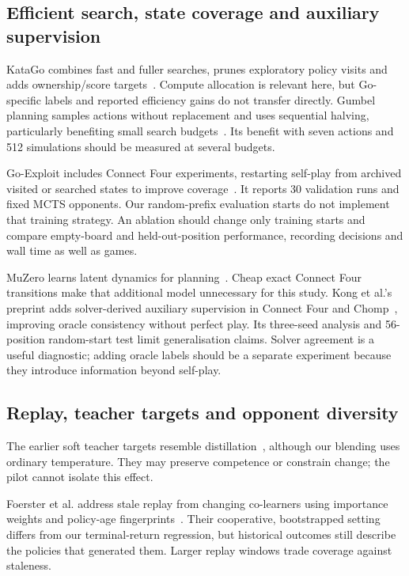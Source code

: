 \documentclass[letterpaper]{article}
\begin{document}
\subsection{Efficient search, state coverage and auxiliary supervision}
KataGo combines fast and fuller searches, prunes exploratory policy visits and
adds ownership/score targets~\cite{wu2019}. Compute allocation is relevant here,
but Go-specific labels and reported efficiency gains do not transfer directly.
Gumbel planning samples actions without replacement and uses sequential halving,
particularly benefiting small search budgets~\cite{danihelka2022}. Its benefit
with seven actions and 512 simulations should be measured at several budgets.

Go-Exploit includes Connect Four experiments, restarting self-play from archived
visited or searched states to improve coverage~\cite{trudeau2023}. It reports
30 validation runs and fixed MCTS opponents. Our random-prefix evaluation starts
do not implement that training strategy. An ablation should change only training
starts and compare empty-board and held-out-position performance, recording
decisions and wall time as well as games.

MuZero learns latent dynamics for planning~\cite{schrittwieser2020}. Cheap exact
Connect Four transitions make that additional model unnecessary for this study.
Kong et al.'s preprint adds solver-derived auxiliary supervision in Connect Four
and Chomp~\cite{kong2026}, improving oracle consistency without perfect play.
Its three-seed analysis and 56-position random-start test limit generalisation
claims. Solver agreement is a useful diagnostic; adding oracle labels should be
a separate experiment because they introduce information beyond self-play.

\subsection{Replay, teacher targets and opponent diversity}
The earlier soft teacher targets resemble distillation~\cite{hinton2015}, although
our blending uses ordinary temperature. They may preserve competence or constrain
change; the pilot cannot isolate this effect.

Foerster et al. address stale replay from changing co-learners using importance
weights and policy-age fingerprints~\cite{foerster2017}. Their cooperative,
bootstrapped setting differs from our terminal-return regression, but historical
outcomes still describe the policies that generated them. Larger replay windows
trade coverage against staleness.
\end{document}
